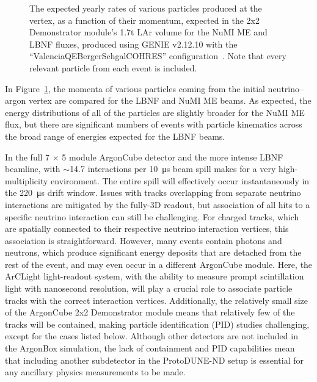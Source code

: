 \begin{figure}[htb]
  \caption{The expected yearly rates of various particles produced at the vertex, as a function of their momentum, expected in the 2x2 Demonstrator module's 1.7t LAr volume for the NuMI ME and LBNF fluxes, produced using GENIE v2.12.10 with the ``ValenciaQEBergerSehgalCOHRES'' configuration~\cite{genie}. Note that every relevant particle from each event is included.}
  \label{fig:momenta}
\end{figure}
In Figure~\ref{fig:momenta}, the momenta of various particles coming from the initial neutrino--argon vertex are compared for the LBNF and NuMI ME beams. As expected, the energy distributions of all of the particles are slightly broader for the NuMI ME flux, but there are significant numbers of events with particle kinematics across the broad range of energies expected for the LBNF beams.

In the full 7 $\times$ 5 module ArgonCube detector and the more intense LBNF beamline, with $\sim$14.7 interactions per \SI{10}{\micro\second} beam spill makes for a very high-multiplicity environment. The entire spill will effectively occur instantaneously in the \SI{220}{\micro\second} drift window. Issues with tracks overlapping from separate neutrino interactions are mitigated by the fully-3D readout, but association of all hits to a specific neutrino interaction can still be challenging. For charged tracks, which are spatially connected to their respective neutrino interaction vertices, this association is straightforward.  However, many events contain photons and neutrons, which produce significant energy deposits that are detached from the rest of the event, and may even occur in a different ArgonCube module. Here, the ArCLight light-readout system, with the ability to measure prompt scintillation light with nanosecond resolution, will play a crucial role to associate particle tracks with the correct interaction vertices. Additionally, the relatively small size of the ArgonCube 2x2 Demonstrator module means that relatively few of the tracks will be contained, making particle identification (PID) studies challenging, except for the cases listed below. Although other detectors are not included in the ArgonBox simulation, the lack of containment and PID capabilities mean that including another subdetector in the ProtoDUNE-ND setup is essential for any ancillary physics measurements to be made.



